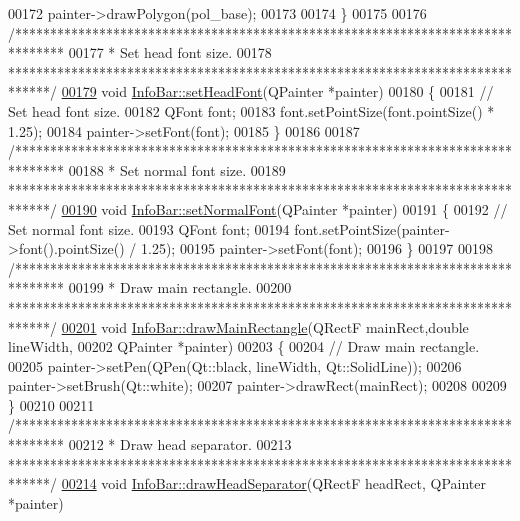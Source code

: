 \begin{DoxyCode}
00172   painter->drawPolygon(pol\_base);
00173 
00174 \}
00175 
00176 \textcolor{comment}{/*******************************************************************************}
00177 \textcolor{comment}{ * Set head font size.}
00178 \textcolor{comment}{ ******************************************************************************/}
\hypertarget{infobar_8cpp_source_l00179}{}\hyperlink{class_info_bar_a9d49c5f446e209ac2a99f48991040745}{00179} \textcolor{keywordtype}{void} \hyperlink{class_info_bar_a9d49c5f446e209ac2a99f48991040745}{InfoBar::setHeadFont}(QPainter *painter)
00180 \{
00181   \textcolor{comment}{// Set head font size.}
00182   QFont font;
00183   font.setPointSize(font.pointSize() * 1.25);
00184   painter->setFont(font);
00185 \}
00186 
00187 \textcolor{comment}{/*******************************************************************************}
00188 \textcolor{comment}{ * Set normal font size.}
00189 \textcolor{comment}{ ******************************************************************************/}
\hypertarget{infobar_8cpp_source_l00190}{}\hyperlink{class_info_bar_a2bfda27ec3d1ae6b4b1c927876f594c1}{00190} \textcolor{keywordtype}{void} \hyperlink{class_info_bar_a2bfda27ec3d1ae6b4b1c927876f594c1}{InfoBar::setNormalFont}(QPainter *painter)
00191 \{
00192   \textcolor{comment}{// Set normal font size.}
00193   QFont font;
00194   font.setPointSize(painter->font().pointSize() / 1.25);
00195   painter->setFont(font);
00196 \}
00197 
00198 \textcolor{comment}{/*******************************************************************************}
00199 \textcolor{comment}{ * Draw main rectangle.}
00200 \textcolor{comment}{ ******************************************************************************/}
\hypertarget{infobar_8cpp_source_l00201}{}\hyperlink{class_info_bar_a5d5440d1ca77a5366e51ac9e6f6aa4d3}{00201} \textcolor{keywordtype}{void} \hyperlink{class_info_bar_a5d5440d1ca77a5366e51ac9e6f6aa4d3}{InfoBar::drawMainRectangle}(QRectF mainRect,\textcolor{keywordtype}{double} lineWidth,
00202                                 QPainter *painter)
00203 \{
00204   \textcolor{comment}{// Draw main rectangle.}
00205   painter->setPen(QPen(Qt::black, lineWidth, Qt::SolidLine));
00206   painter->setBrush(Qt::white);
00207   painter->drawRect(mainRect);
00208 
00209 \}
00210 
00211 \textcolor{comment}{/*******************************************************************************}
00212 \textcolor{comment}{ * Draw head separator.}
00213 \textcolor{comment}{ ******************************************************************************/}
\hypertarget{infobar_8cpp_source_l00214}{}\hyperlink{class_info_bar_a9b89dc7229ecee097d9ca9c4e6fa38f2}{00214} \textcolor{keywordtype}{void} \hyperlink{class_info_bar_a9b89dc7229ecee097d9ca9c4e6fa38f2}{InfoBar::drawHeadSeparator}(QRectF headRect, QPainter *painter)

\end{DoxyCode}
